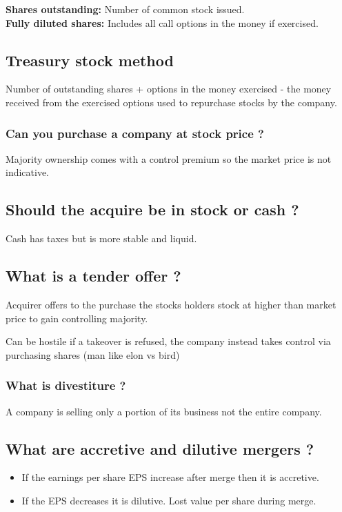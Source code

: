 \documentclass[11pt]{scrartcl} %
\begin{document}
\textbf{Shares outstanding:}  Number of common stock issued.\\
\textbf{Fully diluted shares:} Includes all call options in the money if exercised.

\subsection{Treasury stock method}

Number of outstanding shares + options in the money exercised - the money received from the exercised options used to repurchase stocks by the company.

\subsubsection{Can you purchase a company at stock price ?}

Majority ownership comes with a control premium so the market price is not indicative.

\subsection{Should the acquire be in stock or cash ?}

Cash has taxes but is more stable and liquid. 

\subsection{What is a tender offer ?}

Acquirer offers to the purchase the stocks holders stock at higher than market price to gain controlling majority.

Can be hostile if a takeover is refused, the company instead takes control via purchasing shares (man like elon vs bird)

\subsubsection{What is divestiture ?}

A company is selling only a portion of its business not the entire company.

\subsection{What are accretive and dilutive mergers ?}

\begin{itemize}
	\item If the earnings per share EPS increase after merge then it is accretive.
	\item If the EPS decreases it is dilutive. Lost value per share during merge.
\end{itemize}
\end{document}
